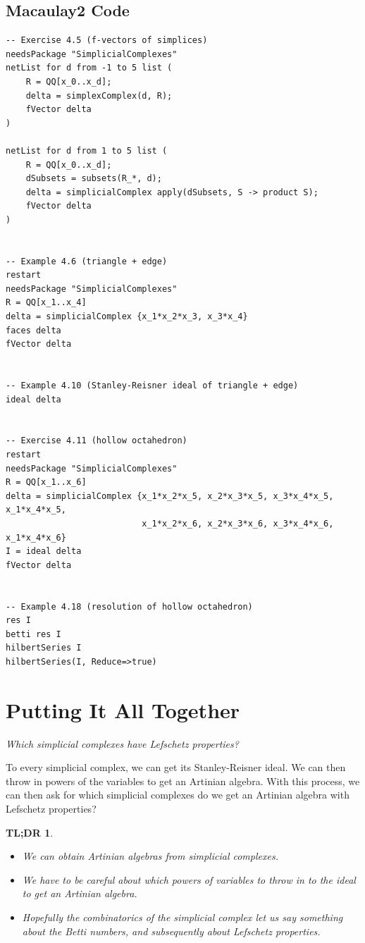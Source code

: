 \documentclass[12pt,a4paper]{article}
\newtheorem*{tldr}{TL;DR}
\theoremstyle{definition}
\numberwithin{equation}{section}
\begin{document}
\subsection{Macaulay2 Code}
\begin{verbatim}
-- Exercise 4.5 (f-vectors of simplices)
needsPackage "SimplicialComplexes"
netList for d from -1 to 5 list (
    R = QQ[x_0..x_d];
    delta = simplexComplex(d, R);
    fVector delta
)

netList for d from 1 to 5 list (
    R = QQ[x_0..x_d];
    dSubsets = subsets(R_*, d);
    delta = simplicialComplex apply(dSubsets, S -> product S);
    fVector delta
)


-- Example 4.6 (triangle + edge)
restart
needsPackage "SimplicialComplexes"
R = QQ[x_1..x_4]
delta = simplicialComplex {x_1*x_2*x_3, x_3*x_4}
faces delta
fVector delta


-- Example 4.10 (Stanley-Reisner ideal of triangle + edge)
ideal delta


-- Exercise 4.11 (hollow octahedron)
restart
needsPackage "SimplicialComplexes"
R = QQ[x_1..x_6]
delta = simplicialComplex {x_1*x_2*x_5, x_2*x_3*x_5, x_3*x_4*x_5, x_1*x_4*x_5,
                           x_1*x_2*x_6, x_2*x_3*x_6, x_3*x_4*x_6, x_1*x_4*x_6}
I = ideal delta
fVector delta


-- Example 4.18 (resolution of hollow octahedron)
res I
betti res I 
hilbertSeries I
hilbertSeries(I, Reduce=>true)
\end{verbatim}






\newpage
\section{Putting It All Together}
\textit{Which simplicial complexes have Lefschetz properties?}

\vspace*{2.5cm}

To every simplicial complex, we can get its Stanley-Reisner ideal.
We can then throw in powers of the variables to get an Artinian algebra.
With this process, we can then ask for which simplicial complexes do we get an Artinian algebra with Lefschetz properties?

\vspace*{2.5cm}

\begin{tldr}
    \phantom{ }
    \begin{itemize}
        \item We can obtain Artinian algebras from simplicial complexes.
        
        \item We have to be careful about which powers of variables to throw in to the ideal to get an Artinian algebra.

        \item Hopefully the combinatorics of the simplicial complex let us say something about the Betti numbers, and subsequently about Lefschetz properties.
    \end{itemize}
\end{tldr}
\end{document}
